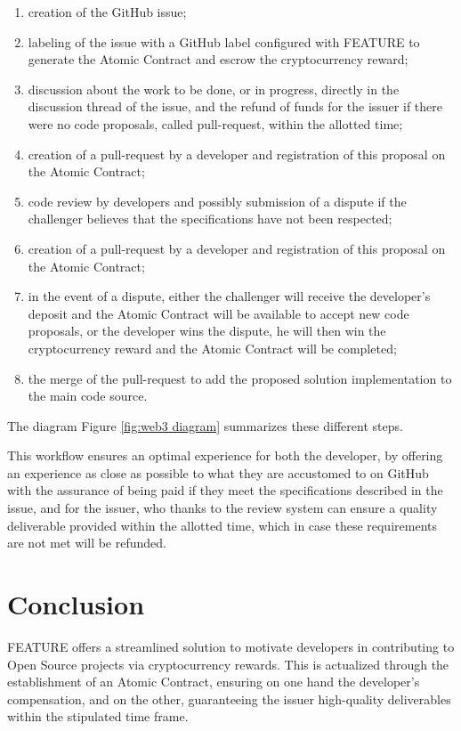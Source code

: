 \documentclass[
	a4paper, %
	10pt, %
	unnumberedsections, %
	twoside, %
]{LTJournalArticle}
\begin{document}
\begin{enumerate}
\item
  creation of the GitHub issue;
\item
  labeling of the issue with a GitHub label configured with FEATURE to generate the Atomic Contract and escrow the cryptocurrency reward;
\item
  discussion about the work to be done, or in progress, directly in the discussion thread of the issue, and the refund of funds for the issuer if there were no code proposals, called pull-request, within the allotted time;
\item
  creation of a pull-request by a developer and registration of this proposal on the Atomic Contract;
\item
  code review by developers and possibly submission of a dispute if the challenger believes that the specifications have not been respected;
\item
  creation of a pull-request by a developer and registration of this proposal on the Atomic Contract;
\item
  in the event of a dispute, either the challenger will receive the developer's deposit and the Atomic Contract will be available to accept new code proposals, or the developer wins the dispute, he will then win the cryptocurrency reward and the Atomic Contract will be completed;
\item
  the merge of the pull-request to add the proposed solution implementation to the main code source.
\end{enumerate}

The diagram Figure \ref{fig:web3 diagram} summarizes these different steps.

This workflow ensures an optimal experience for both the developer, by offering an experience as close as possible to what they are accustomed to on GitHub with the assurance of being paid if they meet the specifications described in the issue, and for the issuer, who thanks to the review system can ensure a quality deliverable provided within the allotted time, which in case these requirements are not met will be refunded.

\section{Conclusion}

FEATURE offers a streamlined solution to motivate developers in contributing to Open Source projects via cryptocurrency rewards. This is actualized through the establishment of an Atomic Contract, ensuring on one hand the developer's compensation, and on the other, guaranteeing the issuer high-quality deliverables within the stipulated time frame.
\end{document}
